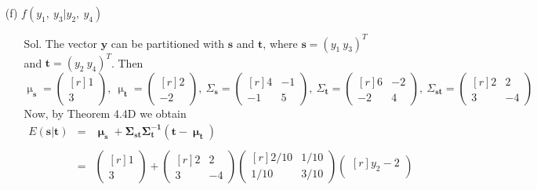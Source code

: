 \documentclass[12pt]{article} %
\begin{document}
\begin{enumerate}
\begin{enumerate}
		\item[(f)] $f(y_{1},~y_{3} | y_{2},~y_{4})$
			\begin{enumerate}
				\item[Sol.] The vector $\mathbf{y}$ can be partitioned with $\mathbf{s}$ and $\mathbf{t}$,
				where $\mathbf{s}=(y_{1}~y_{3})^T$ and $\mathbf{t}=(y_{2}~y_{4})^T$. Then 
				\begin{equation*}
					\upmu_{\mathbf{s}}=
						\begin{pmatrix}[r]
						1 \\
						3
						\end{pmatrix},~
					\upmu_{\mathbf{t}}=
						\begin{pmatrix}[r]
						 2 \\
						-2
						\end{pmatrix},~
					\Sigma_{\mathbf{s}}=
						\begin{pmatrix}[r]
							4 & -1 \\
							-1 & 5
						\end{pmatrix},~
					\Sigma_{\mathbf{t}}=
						\begin{pmatrix}[r]
							6 & -2 \\
						   -2 &  4 
						\end{pmatrix},~
					\Sigma_{\mathbf{st}}=								
						\begin{pmatrix}[r]
							2 &  2 \\
							3  & -4
						\end{pmatrix}													
				\end{equation*}
				Now, by Theorem 4.4D we obtain
				\begin{eqnarray*}
					E(\mathbf{s}|\mathbf{t})&=&
					\mathbf{\upmu_{\mathbf{s}}+\Sigma_{\mathbf{st}}\Sigma_{\mathbf{t}}^{-1}(\mathbf{t}-\upmu_{\mathbf{t}})}\\
					\\
					&=&
					\begin{pmatrix}[r]
					1 \\
					3 
					\end{pmatrix}+
					\begin{pmatrix}[r]
					2 &  2 \\
					3  &-4 
					\end{pmatrix}					
					\begin{pmatrix}[r]
					2/10 & 1/10	\\
					1/10 & 3/10
					\end{pmatrix}
					\begin{pmatrix}[r]
						y_{2}-2 \\

\end{pmatrix}
\end{eqnarray*}
\end{enumerate}
\end{enumerate}
\end{enumerate}
\end{document}
